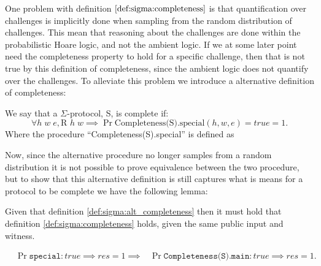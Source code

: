 One problem with definition $\ref{def:sigma:completeness}$ is that
quantification over challenges is implicitly done when sampling from the random
distribution of challenges. This mean that reasoning about the challenges are
done within the probabilistic Hoare logic, and not the ambient logic. If we at
some later point need the completeness property to hold for a specific
challenge, then that is not true by this definition of completeness, since
the ambient logic does not quantify over the challenges. To alleviate this
problem we introduce a alternative definition of completeness:

\begin{definition}
\label{def:sigma:alt_completeness}
  We say that a $\Sigma$-protocol, S, is complete if:
  \begin{equation}
    \label{eq:sigma_completeness}
    \forall h \; w \; e, \text{R } h \; w \implies \Pr{\text{Completeness(S).special}(h,w,e) = true} = 1.
  \end{equation}
  Where the procedure ``Completeness(S).special'' is defined as
  
\end{definition}

Now, since the alternative procedure no longer samples from a random
distribution it is not possible to prove equivalence between the two procedure,
but to show that this alternative definition is still captures what is means for
a protocol to be complete we have the following lemma:

\begin{lemma}
  \label{lem:sigma:alt:completeness}
Given that definition \ref{def:sigma:alt_completeness} then it must hold that
definition \ref{def:sigma:completeness} holds, given the same public input and witness.

\begin{align*}
  &\Pr{\texttt{special} : true \implies res} = 1 \implies
    &\Pr{\texttt{Completeness(S).main} : true \implies res} = 1.
\end{align*}
\end{lemma}

